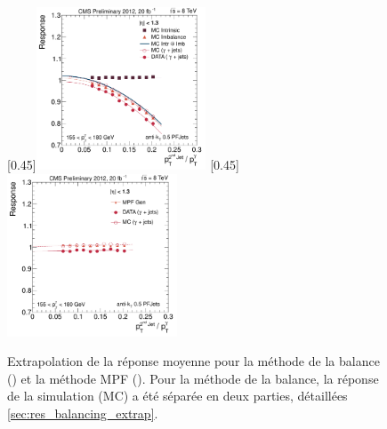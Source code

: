\begin{figure}[tbp]
    \centering
    \subcaptionbox{\label{fig:extrap_balancing}}[0.45\textwidth]{\includegraphics[width=0.45\textwidth]{chapitre4/figs/extrap/response_eta013_ptPhot_155_180.pdf}}\hfill
    \subcaptionbox{\label{fig:extrap_mpf}}[0.45\textwidth]{\includegraphics[width=0.45\textwidth]{chapitre4/figs/extrap/responseMPF_eta013_ptPhot_155_180.pdf}}
    \caption{Extrapolation de la réponse moyenne pour la méthode de la balance () et la méthode MPF (). Pour la méthode de la balance, la réponse de la simulation (MC) a été séparée en deux parties, détaillées \cref{sec:res_balancing_extrap}.}
\end{figure}


